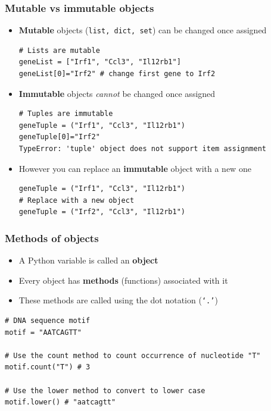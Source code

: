 \documentclass[xcolor=table]{beamer}
\begin{document}
\begin{frame}[fragile]
\frametitle{Mutable vs immutable objects}

\begin{itemize}

\item<1-> \textbf{Mutable} objects (\texttt{list, dict, set}) can be changed once assigned
\begin{lstlisting}[style=python]
# Lists are mutable
geneList = ["Irf1", "Ccl3", "Il12rb1"]
geneList[0]="Irf2" # change first gene to Irf2
\end{lstlisting}  

\item<2-> \textbf{Immutable} objects \textit{cannot} be changed once assigned 
\begin{lstlisting}[style=python]
# Tuples are immutable
geneTuple = ("Irf1", "Ccl3", "Il12rb1")
geneTuple[0]="Irf2"
TypeError: 'tuple' object does not support item assignment
\end{lstlisting}  

\item<3-> However you can replace an \textbf{immutable} object with a new one 
\begin{lstlisting}[style=python]
geneTuple = ("Irf1", "Ccl3", "Il12rb1")
# Replace with a new object
geneTuple = ("Irf2", "Ccl3", "Il12rb1")
\end{lstlisting} 

\end{itemize}

\end{frame}

\begin{frame}[fragile]
\frametitle{Methods of objects}

\begin{itemize}\addtolength{\itemsep}{0.5\baselineskip}
	\item A Python variable is called an \textbf{object}
	\item Every object has \textbf{methods} (functions) associated with it
	\item These methods are called using the dot notation (\texttt{`.'})
\end{itemize}
\begin{lstlisting}[style=python]
# DNA sequence motif
motif = "AATCAGTT"

# Use the count method to count occurrence of nucleotide "T" 
motif.count("T") # 3

# Use the lower method to convert to lower case
motif.lower() # "aatcagtt"
\end{lstlisting} 

\end{frame}
\end{document}

